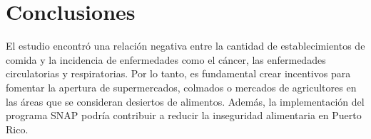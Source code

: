 \documentclass[10pt, oneside]{article}
\begin{document}
\section{Conclusiones}

El estudio encontró una relación negativa entre la cantidad de establecimientos de comida y la incidencia de enfermedades como el cáncer, las enfermedades circulatorias y respiratorias. Por lo tanto, es fundamental crear incentivos para fomentar la apertura de supermercados, colmados o mercados de agricultores en las áreas que se consideran desiertos de alimentos. Además, la implementación del programa SNAP podría contribuir a reducir la inseguridad alimentaria en Puerto Rico.
\end{document}
